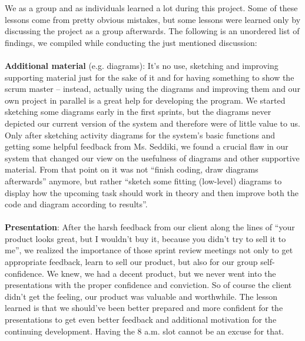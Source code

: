 We as a group and as individuals learned a lot during this project. Some of these lessons come from pretty obvious mistakes, but some lessons were learned only by discussing the project as a group afterwards. The following is an unordered list of findings, we compiled while conducting the just mentioned discussion:\\
\ \\
\textbf{Additional material} (e.g. diagrams): It’s no use, sketching and improving supporting material just for the sake of it and for having something to show the scrum master – instead, actually using the diagrams and improving them and our own project in parallel is a great help for developing the program. We started sketching some diagrams early in the first sprints, but the diagrams never depicted our current version of the system and therefore were of little value to us. Only after sketching activity diagrams for the system’s basic functions and getting some helpful feedback from Ms. Seddiki, we found a crucial flaw in our system that changed our view on the usefulness of diagrams and other supportive material. From that point on it was not “finish coding, draw diagrams afterwards” anymore, but rather “sketch some fitting (low-level) diagrams to display how the upcoming task should work in theory and then improve both the code and diagram according to results”.  \\
\ \\
\textbf{Presentation}: After the harsh feedback from our client along the lines of “your product looks great, but I wouldn’t buy it, because you didn’t try to sell it to me”, we realized the importance of those sprint review meetings not only to get appropriate feedback, learn to sell our product, but also for our group self-confidence. We knew, we had a decent product, but we never went into the presentations with the proper confidence and conviction. So of course the client didn’t get the feeling, our product was valuable and worthwhile. The lesson learned is that we should’ve been better prepared and more confident for the presentations to get even better feedback and additional motivation for the continuing development. Having the 8 a.m. slot cannot be an excuse for that. \\
\ \\

